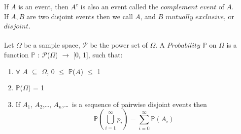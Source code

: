 \documentclass{article}
\newcommand{\ti}[1]{\textit{#1}}
\newcommand{\bbP}{\mathbb{P}}
\newcommand{\Om}{\Omega}
\begin{document}
If $A$ is an event, then $A^{c}$ is also an event called the $\ti{complement event}$ of $A$.\\
If $A, B$ are two disjoint events then we call $A$, and $B$ $\ti{mutually exclusive}$, or $\ti{disjoint}$.\\\\
Let $\Omega$ be a sample space, $\mathcal{P}$ be the power set of $\Om$. A $\ti{Probability}$ $\bbP$ on $\Om$ is a function $\bbP$ : $\mathcal{P}$($\Om$) $\rightarrow$ [0, 1], such that:
\begin{enumerate}
	\item $\forall$ $A$ $\subseteq$ $\Om$, 0 $\leq$ $\bbP$($A$) $\leq$ 1
	\item $\bbP$($\Om$) = 1
	\item If $A_{1}$, $A_{2}$,\dots, $A_{n}$,\dots\ is a sequence of pairwise disjoint events then
\[ \bbP(\bigcup_{i=1}^{\infty} p_{i}) = \sum_{i=0}^{\infty} \bbP(A_{i}) \]
\end{enumerate}
\newpage
\end{document}
